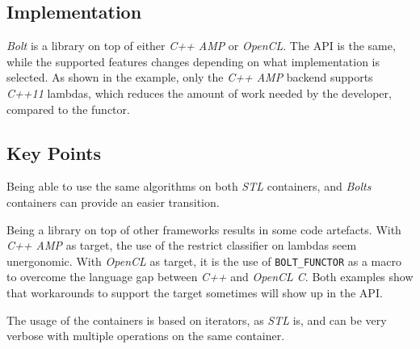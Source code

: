 \subsection{Implementation}
\textit{Bolt} is a library on top of either \textit{C++ AMP} or \textit{OpenCL}. The API is the same, while the supported features changes depending on what implementation is selected.
As shown in the example, only the \textit{C++ AMP} backend supports \textit{C++11} lambdas, which reduces the amount of work needed by the developer, compared to the functor.

\subsection{Key Points}
Being able to use the same algorithms on both \textit{STL} containers, and \textit{Bolts} containers can provide an easier transition.

Being a library on top of other frameworks results in some code artefacts. With \textit{C++ AMP} as target, the use of the restrict classifier on lambdas seem unergonomic. With \textit{OpenCL} as target, it is the use of \texttt{BOLT\_FUNCTOR} as a macro to overcome the language gap between \textit{C++} and \textit{OpenCL C}. Both examples show that workarounds to support the target sometimes will show up in the API. 

The usage of the containers is based on iterators, as \textit{STL} is, and can be very verbose with multiple operations on the same container.
